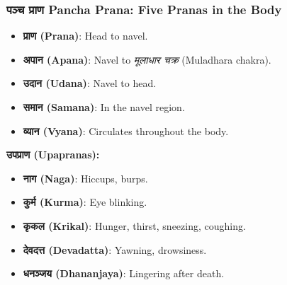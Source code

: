 \begin{frame}[fragile]\frametitle{पञ्च  प्राण  Pancha Prana: Five Pranas in the Body}

	\begin{itemize} 
	\item \textbf{प्राण (Prana)}: Head to navel. 
	\item \textbf{अपान (Apana)}: Navel to \textit{मूलाधार चक्र} (Muladhara chakra). 
	\item \textbf{उदान (Udana)}: Navel to head. 
	\item \textbf{समान (Samana)}: In the navel region. 
	\item \textbf{व्यान (Vyana)}: Circulates throughout the body. 
	\end{itemize}

	\vspace{0.5cm} 
	
	\textbf{उपप्राण (Upapranas):} 
	\begin{itemize} 
	\item \textbf{नाग (Naga)}: Hiccups, burps. 
	\item \textbf{कुर्म (Kurma)}: Eye blinking. 
	\item \textbf{कृकल (Krikal)}: Hunger, thirst, sneezing, coughing. 
	\item \textbf{देवदत्त (Devadatta)}: Yawning, drowsiness. 
	\item \textbf{धनञ्जय (Dhananjaya)}: Lingering after death. 
	\end{itemize}
\end{frame}

